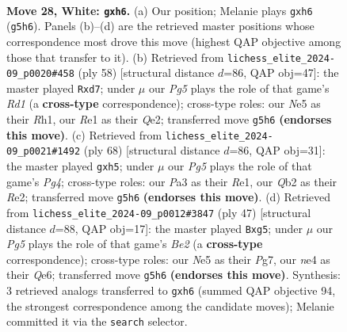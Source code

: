 \documentclass[11pt]{article}
\begin{document}
\clearpage

\begin{figure}[p]\centering
\begin{subfigure}{0.46\textwidth}\centering
\resizebox{\linewidth}{!}{%
\newchessgame
\chessboard[
  setfen={r2qb1k1/pr3pp1/7p/p2pN1P1/4n2P/PP1B4/1Q3P2/R3R1K1 w - - 1 28},
  showmover=false,
  pgfstyle=straightmove, color=movearrow, markmove={g5-h6}
]}
\caption{}
\end{subfigure}\hfill
\begin{subfigure}{0.46\textwidth}\centering
\resizebox{\linewidth}{!}{%
\newchessgame
\chessboard[
  setfen={4r1k1/2pr1pb1/1pq3p1/p5P1/PnN1P3/1P2BP2/4Q1K1/3R3R w - - 1 30},
  showmover=false,
  pgfstyle=straightmove, color=movearrow, markmove={d1-d7}
]}
\caption{}
\end{subfigure}
\\[4pt]
\begin{subfigure}{0.46\textwidth}\centering
\resizebox{\linewidth}{!}{%
\newchessgame
\chessboard[
  setfen={r5k1/r1p2pn1/1p1q2p1/3P3p/1P1Q1PP1/3B4/4R2P/4R1K1 w - - 0 35},
  showmover=false,
  pgfstyle=straightmove, color=movearrow, markmove={g4-h5}
]}
\caption{}
\end{subfigure}\hfill
\begin{subfigure}{0.46\textwidth}\centering
\resizebox{\linewidth}{!}{%
\newchessgame
\chessboard[
  setfen={r4r1k/4b1pp/p3q3/1ppnPpN1/7P/1P6/PBQ2PP1/3RR1K1 b - - 1 24},
  showmover=false,
  pgfstyle=straightmove, color=movearrow, markmove={e7-g5}
]}
\caption{}
\end{subfigure}
\caption{\textbf{Move 28, White: \texttt{gxh6}.} (a) Our position; Melanie plays \texttt{gxh6} (\texttt{g5h6}). Panels (b)--(d) are the retrieved master positions whose correspondence most drove this move (highest QAP objective among those that transfer to it). (b) Retrieved from \texttt{lichess\_elite\_2024-09\_p0020\#458} (ply 58) [structural distance $d$=86, QAP obj=47]: the master played \texttt{Rxd7}; under $\mu$ our \emph{Pg5} plays the role of that game's \emph{Rd1} (a \textbf{cross-type} correspondence); cross-type roles: our \emph{N}e5 as their \emph{R}h1, our \emph{R}e1 as their \emph{Q}e2; transferred move \texttt{g5h6} \textbf{(endorses this move)}. (c) Retrieved from \texttt{lichess\_elite\_2024-09\_p0021\#1492} (ply 68) [structural distance $d$=86, QAP obj=31]: the master played \texttt{gxh5}; under $\mu$ our \emph{Pg5} plays the role of that game's \emph{Pg4}; cross-type roles: our \emph{P}a3 as their \emph{R}e1, our \emph{Q}b2 as their \emph{R}e2; transferred move \texttt{g5h6} \textbf{(endorses this move)}. (d) Retrieved from \texttt{lichess\_elite\_2024-09\_p0012\#3847} (ply 47) [structural distance $d$=88, QAP obj=17]: the master played \texttt{Bxg5}; under $\mu$ our \emph{Pg5} plays the role of that game's \emph{Be2} (a \textbf{cross-type} correspondence); cross-type roles: our \emph{N}e5 as their \emph{P}g7, our \emph{n}e4 as their \emph{Q}e6; transferred move \texttt{g5h6} \textbf{(endorses this move)}. Synthesis: 3 retrieved analogs transferred to \texttt{gxh6} (summed QAP objective 94, the strongest correspondence among the candidate moves); Melanie committed it via the \texttt{search} selector.}
\label{fig:thought-m54}
\end{figure}
\end{document}
